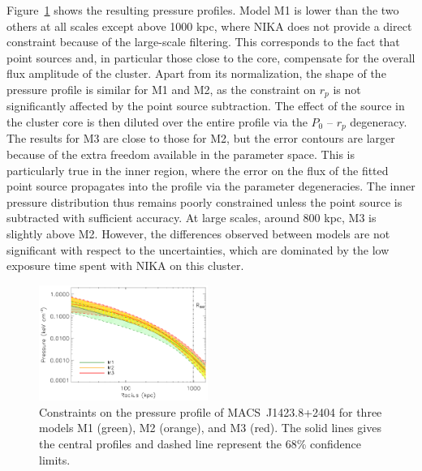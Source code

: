 \documentclass[traditabstract]{aa}
\begin{document}
Figure~\ref{fig:MACSJ1424_pressure_point_source} shows the resulting pressure profiles. Model M1 is lower than the two others at all scales except above 1000 kpc, where NIKA does not provide a direct constraint because of the large-scale filtering. This corresponds to the fact that point sources and, in particular those close to the core, compensate for the overall flux amplitude of the cluster. Apart from its normalization, the shape of the pressure profile is similar for M1 and M2, as the constraint on $r_p$ is not significantly affected by the point source subtraction. The effect of the source in the cluster core is then diluted over the entire  profile via the $P_0$ -- $r_p$ degeneracy. The results for M3 are close to those for M2, but the error contours are larger because of the extra freedom available in the parameter space. This is particularly true in the inner region, where the error on the flux of the fitted point source propagates into the profile via the parameter degeneracies. The inner pressure distribution thus remains poorly constrained unless the point source is subtracted with sufficient accuracy. At large scales, around 800 kpc,  M3 is slightly above M2. However, the differences observed between models are not significant with respect to the uncertainties, which are dominated by the low exposure time spent with NIKA on this cluster.
\begin{figure}[h]
\centering
\includegraphics[width=0.49\textwidth]{Figure/ICM_pressure_profile_point_sources.pdf}
\caption{\footnotesize Constraints on the pressure profile of \mbox{MACS~J1423.8+2404} for  three models M1 (green), M2 (orange), and M3 (red). The solid lines gives the central profiles and dashed line represent the 68\% confidence limits.}
\label{fig:MACSJ1424_pressure_point_source}
\end{figure}
\end{document}
